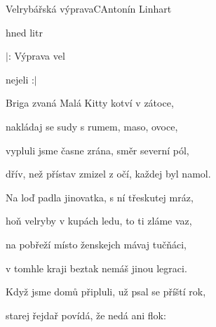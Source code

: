 \setcounter{page}{97}
\begin{song}{Velrybářská výprava}{C}{Antonín Linhart}

\begin{SBVerse}



 hned litr 


\end{SBVerse}

\begin{SBChorus}

$|$: Výprava vel

 nejeli  :$|$

\end{SBChorus}

\begin{SBVerse}

Briga zvaná Malá Kitty kotví v zátoce,

nakládaj se sudy s rumem, maso, ovoce,

vypluli jsme časne zrána, směr severní pól,

dřív, než přístav zmizel z očí, každej byl namol.

\end{SBVerse}

\begin{SBVerse}

Na loď padla jinovatka, s ní třeskutej mráz,

hoň velryby v kupách ledu, to ti zláme vaz,

na pobřeží místo ženskejch mávaj tučňáci,

v tomhle kraji beztak nemáš jinou legraci.

\end{SBVerse}

\begin{SBVerse}

Když jsme domů připluli, už psal se příští rok,

starej řejdař povídá, že nedá ani flok:


\end{SBVerse}
\end{song}
